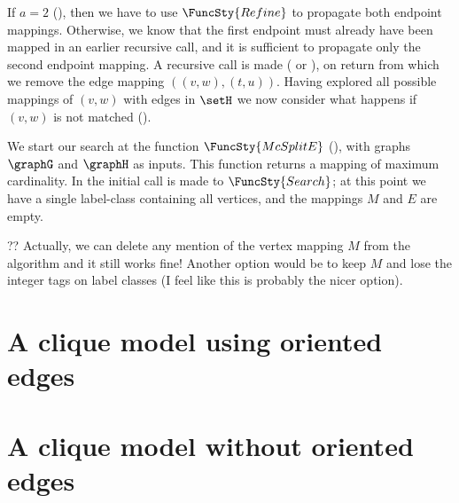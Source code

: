 If $a=2$ (), then we have to use $\FuncSty{Refine}$ to propagate
both endpoint mappings.  Otherwise, we know that the first endpoint must already have
been mapped in an earlier recursive call, and it is sufficient to propagate only the second
endpoint mapping.  
A recursive call is made ( or ),
on return from which we remove the edge mapping $((v,w),(t,u))$.
Having explored all possible mappings of $(v,w)$ with edges in $\setH$ we now
consider what happens if $(v,w)$ is not matched
().

We start our search at the function $\FuncSty{McSplitE}$ (),
with graphs $\graphG$ and $\graphH$ as inputs.  This function returns a mapping of
maximum cardinality.  In  the initial call is made to
$\FuncSty{Search}$; at this point we have a single label-class containing all
vertices, and the mappings $M$ and $E$ are empty.

?? Actually, we can delete any mention of the vertex mapping $M$ from the algorithm and it still works fine!
Another option would be to keep $M$ and lose the integer tags on label classes (I feel like this is probably the
nicer option).

\section{A clique model using oriented edges}

\section{A clique model without oriented edges}
